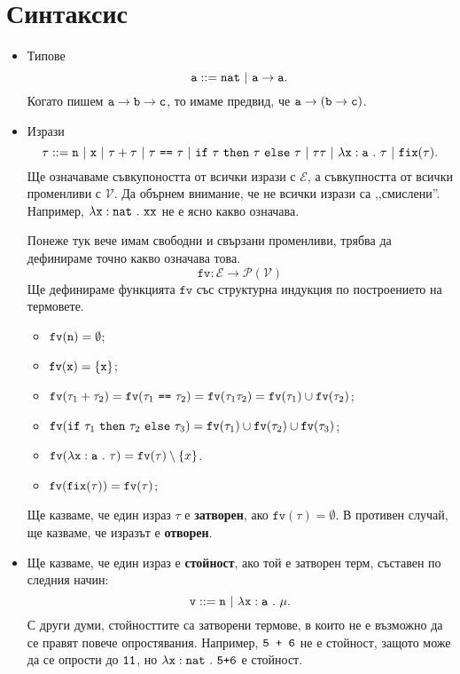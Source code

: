 \section{Синтаксис}

\newcommand{\rename}[2]{\{\vv{#1}/\vv{#2}\}}

\newcommand{\fv}{\texttt{fv}}

\begin{itemize}
\item
  Типове
  \[\vv{a} ::= \vv{nat}\ |\ \vv{a} \to \vv{a}.\]
  Когато пишем 
  $\texttt{a} \to \texttt{b} \to \texttt{c}$, то имаме предвид, че
  $\texttt{a} \to (\texttt{b} \to \texttt{c})$.
\item
  Изрази
  \[\tau ::= \vv{n}\ |\ \vv{x}\ |\ \tau + \tau\ |\ \tau\ \vv{==}\ \tau\ |\ \ifelse{\tau}{\tau}{\tau}\ |\ \tau\tau\ |\ \lamb{x}{a}{\tau}\ |\ \fix(\tau).\]
  Ще означаваме съвкупоността от всички изрази с $\mathcal{E}$, а съвкупността от всички променливи с $\mathcal{V}$.
  Да обърнем внимание, че не всички изрази са ,,смислени''. Например,
  $\lambda\texttt{x}:\texttt{nat}\ .\ {\texttt{xx}}$ не е ясно какво означава.
  
  Понеже тук вече имам свободни и свързани променливи, трябва да дефинираме точно какво означава това.
  \[\fv:\mathcal{E} \to \mathcal{P}(\mathcal{V})\]
  Ще дефинираме функцията $\texttt{fv}$ със структурна индукция по построението на термовете.
  
  \begin{itemize}
  \item
    $\fv(\vv{n}) = \emptyset$;
  \item
    $\fv(\vv{x}) = \{\vv{x}\}$;
  \item
    $\fv(\tau_1 + \tau_2) = \fv(\tau_1\ \vv{==}\ \tau_2) = \fv(\tau_1\tau_2) = \fv(\tau_1) \cup \fv(\tau_2)$;
  \item
    $\fv(\ifelse{\tau_1}{\tau_2}{\tau_3}) = \fv(\tau_1) \cup \fv(\tau_2) \cup \fv(\tau_3)$;
  \item
    $\fv(\lamb{x}{a}{\tau}) = \fv(\tau) \setminus \{x\}$.
  \item
    $\fv(\fix(\tau)) = \fv(\tau)$;
  \end{itemize}
  
  Ще казваме, че един израз $\tau$ е {\bf затворен}, ако $\fv(\tau) = \emptyset$.
  В противен случай, ще казваме, че изразът е {\bf отворен}.
\item
  Ще казваме, че един израз е {\bf стойност}, ако той е затворен терм, съставен по следния начин:
  \[\texttt{v} ::= \texttt{n}\ |\ \lambda\texttt{x}:\texttt{a}\ .\ {\mu}.\]
  С други думи, стойносттите са затворени термове, в които не е възможно да се правят повече опростявания.
  Например, $\texttt{5 + 6}$ не е стойност, защото може да се опрости до $\texttt{11}$,
  но $\lambda\texttt{x}:\texttt{nat}\ .\ {\texttt{5+6}}$ е стойност.
\end{itemize}

